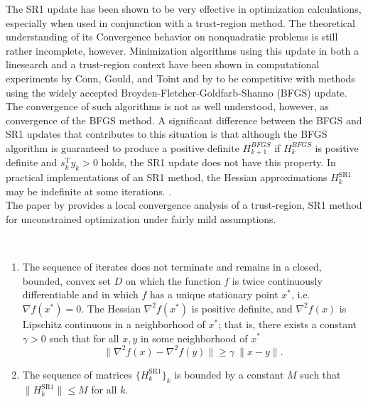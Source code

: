 The SR1 update has been shown to be very effective in optimization calculations, especially when used in conjunction with a trust-region method. The theoretical understanding of its Convergence behavior on nonquadratic problems is still rather incomplete, however. Minimization algorithms using this update in both a linesearch and a trust-region context have been shown in computational experiments by Conn, Gould, and Toint and by to be competitive with methods using the widely accepted Broyden-Fletcher-Goldfarb-Shanno (BFGS) update. The convergence of such algorithms is not as well understood, however, as convergence of the BFGS method. A significant difference between the BFGS and SR1 updates that contributes to this situation is that although the BFGS algorithm is guaranteed to produce a positive definite $H^{BFGS}_{k+1}$ if $H^{BFGS}_k$ is positive definite and $s^{\mathrm{T}}_k y_k > 0$ holds, the SR1 update does not have this property. In practical implementations of an SR1 method, the Hessian approximations $H^\mathrm{SR1}_k$ may be indefinite at some iterations. \cite[p.~1025-1026]{ByrdKhalfanSchnabel:1996}. \\

The paper by \cite{ByrdKhalfanSchnabel:1996} provides a local convergence analysis of a trust-region, SR1 method for unconstrained optimization under fairly mild assumptions. 

\begin{assumption}\label{AssumptionsGlobalConvergence} \ \\[-1.5\baselineskip]
    \begin{enumerate}
        \item The sequence of iterates does not terminate and remains in a closed, bounded, convex set $D$ on which the function $f$ is twice continuously differentiable and in which $f$ has a unique stationary point $x^*$, i.e. $\nabla f(x^*) = 0$. The Hessian $\nabla^2 f(x^*)$ is positive definite, and $\nabla^2 f(x)$ is Lipschitz continuous in a neighborhood of $x^*$; that is, there exists a constant $\gamma > 0$ such that for all $x, y$ in some neighborhood of $x^*$ \begin{equation*} \lVert \nabla^2 f(x) - \nabla^2 f(y) \rVert \geq \gamma \ \lVert x - y \rVert. \end{equation*}
        \item The sequence of matrices $\{ H^{\mathrm{SR1}}_k \}_k$ is bounded by a constant $M$ such that $\lVert H^{\mathrm{SR1}}_k \rVert \leq M$ for all $k$.
    \end{enumerate}
\end{assumption}

